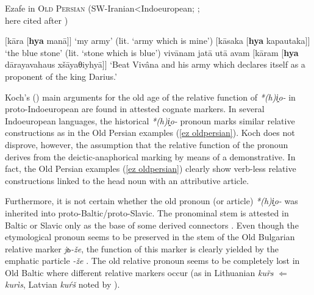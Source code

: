 \begin{exe}
\ex Ezafe in \textsc{Old Persian} (SW-Iranian<Indoeuropean; \citealt{meillet1931};\\
here cited after \citealt[4]{samvelian2007b})
\label{ez oldpersian}
\begin{xlist}
\ex	$[$kāra $[$\textbf{hya} manā$]$$]$
\glt	‘my army’ (lit. ‘army which is mine’)
\ex	$[$kāsaka $[$\textbf{hya} kapautaka$]$$]$
\glt	‘the blue stone’ (lit. ‘stone which is blue’)
\ex	vivānam jatā utā avam $[$kāram [\textbf{hya} dārayavahaus xšāyaθiyhyā$]$$]$
\glt	‘Beat Vivâna and his army which declares itself as a proponent of the king Darius.’
\end{xlist}
\end{exe}
Koch's (\citeyear[53, elsewhere]{koch1992}) main arguments for the old age of the relative function of \textit{*(h)i̭o-} in proto-Indoeuropean are found in attested cognate markers. In several Indoeuropean languages, the historical \textit{*(h)i̭o-} pronoun marks similar relative constructions as in the Old Persian examples (\ref{ez oldpersian}). Koch does not disprove, however, the assumption that the relative function of the pronoun derives from the deictic-anaphorical marking by means of a demonstrative. In fact, the Old Persian examples (\ref{ez oldpersian}) clearly show verb-less relative constructions linked to the head noun with an attributive article.

Furthermore, it is not certain whether the old pronoun (or article) \textit{*(h)i̭o-} was inherited into proto-Baltic/proto-Slavic. The pronominal stem is attested in Baltic or Slavic only as the base of some derived connectors \cite[56]{heinrichs1954}. Even though the etymological pronoun seems to be preserved in the stem of the Old Bulgarian relative marker \textit{jь-že}, the function of this marker is clearly yielded by the emphatic particle \textit{-že} \cite[56]{heinrichs1954}.  %
  The old relative pronoun seems to be completely lost in Old Baltic where different relative markers occur (as in Lithuanian \textit{ku\~rs} $\Leftarrow$ \textit{kurìs}, Latvian \textit{kuŕš} noted by \citealt[15]{schmidt1959}).

